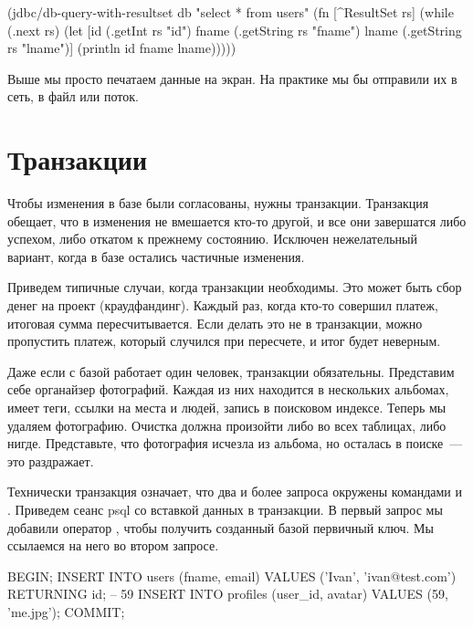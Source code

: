 \begin{english}
  \begin{clojure}
(jdbc/db-query-with-resultset
 db "select * from users"
 (fn [^ResultSet rs]
   (while (.next rs)
     (let [id (.getInt rs "id")
           fname (.getString rs "fname")
           lname (.getString rs "lname")]
       (println id fname lname)))))
  \end{clojure}
\end{english}

Выше мы просто печатаем данные на экран. На практике мы бы отправили их в сеть, в файл или поток.

\section{Транзакции}

Чтобы изменения в базе были согласованы, нужны транзакции. Транзакция обещает, что в изменения не вмешается кто-то другой, и все они завершатся либо успехом, либо откатом к прежнему состоянию. Исключен нежелательный вариант, когда в базе остались частичные изменения.

Приведем типичные случаи, когда транзакции необходимы. Это может быть сбор денег на проект (краудфандинг). Каждый раз, когда кто-то совершил платеж, итоговая сумма пересчитывается. Если делать это не в транзакции, можно пропустить платеж, который случился при пересчете, и итог будет неверным.

Даже если с базой работает один человек, транзакции обязательны. Представим себе органайзер фотографий. Каждая из них находится в нескольких альбомах, имеет теги, ссылки на места и людей, запись в поисковом индексе. Теперь мы удаляем фотографию. Очистка должна произойти либо во всех таблицах, либо нигде. Представьте, что фотография исчезла из альбома, но осталась в поиске~--- это раздражает.

Технически транзакция означает, что два и более запроса окружены командами  и . Приведем сеанс psql со вставкой данных в транзакции. В первый запрос мы добавили оператор , чтобы получить созданный базой первичный ключ. Мы ссылаемся на него во втором запросе.

\begin{english}
  \begin{sql}
BEGIN;
INSERT INTO users (fname, email)
VALUES ('Ivan', 'ivan@test.com') RETURNING id;
-- 59
INSERT INTO profiles (user_id, avatar)
VALUES (59, 'me.jpg');
COMMIT;
  \end{sql}
\end{english}

